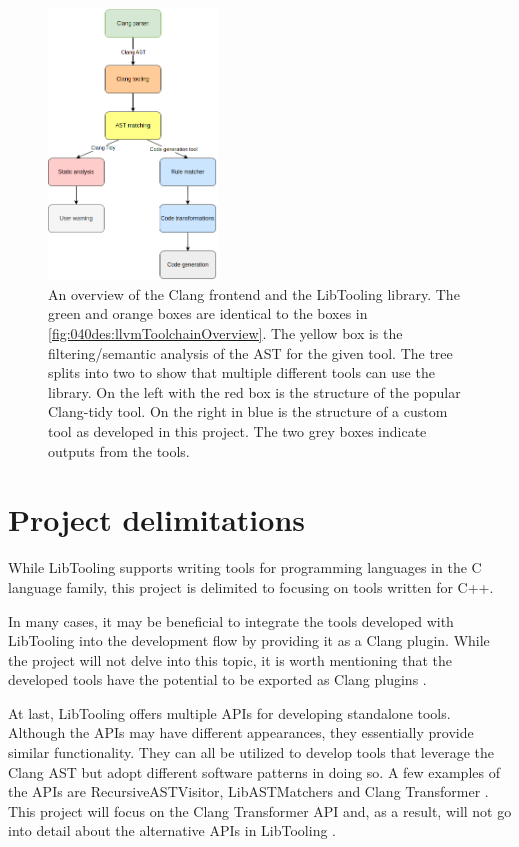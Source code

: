 \begin{figure}[H]
    \centering
    \includegraphics[width=0.4\textwidth]{figs/040des/clang_tool_pipeline.png}
    \caption{An overview of the Clang frontend and the LibTooling library. The green and orange boxes are identical to the boxes in \cref{fig:040des:llvmToolchainOverview}. The yellow box is the filtering/semantic analysis of the AST for the given tool. The tree splits into two to show that multiple different tools can use the library. On the left with the red box is the structure of the popular Clang-tidy tool\cite{clangClangTidyExtraClang}. On the right in blue is the structure of a custom tool as developed in this project. The two grey boxes indicate outputs from the tools.}
    \label{fig:040des:clangToolingOverview}
\end{figure}


\section{Project delimitations}
While LibTooling supports writing tools for programming languages in the C language family, this project is delimited to focusing on tools written for C++.

In many cases, it may be beneficial to integrate the tools developed with LibTooling into the development flow by providing it as a Clang plugin.
While the project will not delve into this topic, it is worth mentioning that the developed tools have the potential to be exported as Clang plugins \cite{clangClangPluginsClang}.

At last, LibTooling offers multiple APIs for developing standalone tools. Although the APIs may have different appearances, they essentially provide similar functionality. They can all be utilized to develop tools that leverage the Clang AST but adopt different software patterns in doing so.
A few examples of the APIs are RecursiveASTVisitor, LibASTMatchers and Clang Transformer \cite{clangHowWriteRecursiveASTVisitor,clangWelcomeClangDocumentation}. This project will focus on the Clang Transformer API and, as a result, will not go into detail about the alternative APIs in LibTooling \cite{clangClangTransformerTutorial}.

